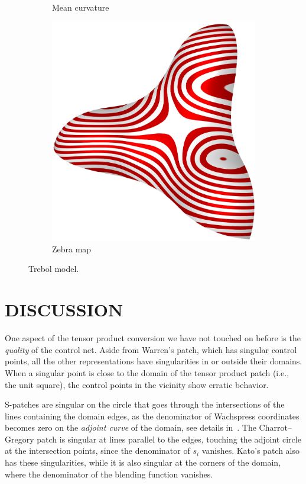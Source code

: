 \documentclass[9pt,academicons]{article}
\begin{document}
\begin{figure}
\begin{subfigure}{.24\textwidth}
    \caption{Mean curvature}
    \label{fig:trebol-mean}
  \end{subfigure}
  \hfill
  \begin{subfigure}{.24\textwidth}
    \centering
    \includegraphics[height=.2\textheight]{images/trebol3-zebra.jpg}
    \caption{Zebra map}
    \label{fig:trebol-zebra}
  \end{subfigure}
  \caption{Trebol model.}
  \label{fig:trebol}
\end{figure}

\section{DISCUSSION}
\label{sec:discussion}
One aspect of the tensor product conversion we have not touched on before is the \emph{quality}
of the control net. Aside from Warren's patch, which has singular control points,
all the other representations have singularities in or outside their domains.
When a singular point is close to the domain of the tensor product patch (i.e., the unit square),
the control points in the vicinity show erratic behavior.

S-patches are singular on the circle that goes
through the intersections of the lines containing the domain edges,
as the denominator of Wachspress coordinates becomes zero on the
\emph{adjoint curve} of the domain, see details in~\cite{Floater:2015}.
The Charrot--Gregory patch is singular at lines parallel to the edges,
touching the adjoint circle at the intersection points, since
the denominator of $s_i$ vanishes.
Kato's patch also has these singularities, while it is also singular at the corners of the domain,
where the denominator of the blending function vanishes.
\end{document}

